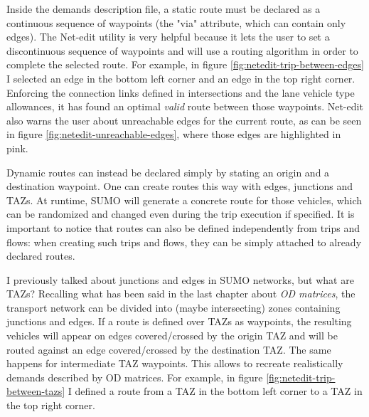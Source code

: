 Inside the demands description file, a static route must be declared as a continuous sequence of waypoints (the "via" attribute, which can contain only edges). The Net-edit utility is very helpful because it lets the user to set a discontinuous sequence of waypoints and will use a routing algorithm in order to complete the selected route. For example, in figure \ref{fig:netedit-trip-between-edges} I selected an edge in the bottom left corner and an edge in the top right corner. Enforcing the connection links defined in intersections and the lane vehicle type allowances, it has found an optimal \textit{valid} route between those waypoints. Net-edit also warns the user about unreachable edges for the current route, as can be seen in figure \ref{fig:netedit-unreachable-edges}, where those edges are highlighted in pink.


Dynamic routes can instead be declared simply by stating an origin and a destination waypoint. One can create routes this way with edges, junctions and TAZs. At runtime, SUMO will generate a concrete route for those vehicles, which can be randomized and changed even during the trip execution if specified. It is important to notice that routes can also be defined independently from trips and flows: when creating such trips and flows, they can be simply attached to already declared routes.

I previously talked about junctions and edges in SUMO networks, but what are TAZs? Recalling what has been said in the last chapter about \textit{OD matrices}, the transport network can be divided into (maybe intersecting) zones containing junctions and edges. If a route is defined over TAZs as waypoints, the resulting vehicles will appear on edges covered/crossed by the origin TAZ and will be routed against an edge covered/crossed by the destination TAZ. The same happens for intermediate TAZ waypoints. This allows to recreate realistically demands described by OD matrices. For example, in figure \ref{fig:netedit-trip-between-tazs} I defined a route from a TAZ in the bottom left corner to a TAZ in the top right corner.


